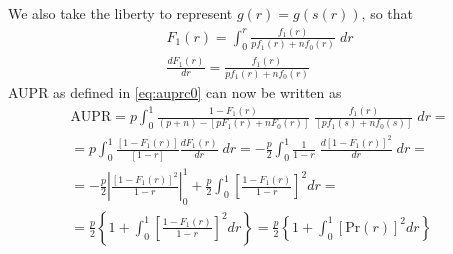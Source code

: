 We also take the liberty to represent $g(r) = g(s(r))$, so that
\begin{gather}
    F_1(r) = \int_0^r \frac{f_1(r)}{pf_1(r) + nf_0(r)} \; dr\\
    \frac{d F_1(r)}{dr} = \frac{f_1(r)}{pf_1(r) + nf_0(r)}
\end{gather}
%
AUPR as defined in \autoref{eq:auprc0} can now be written as
%
\begin{multline}
    \text{AUPR}
    = p \int_{0}^{1}
        \frac{1 - F_1(r)}{(p+n) - [pF_1(r) + nF_0(r)]}
        \; \frac{f_1(r)}{[pf_1(s) + nf_0(s)]}
    \;dr
    =\\
    = p \int_{0}^{1}
        \frac{[1 - F_1(r)]}{[1 - r]}\frac{d F_1(r)}{dr}
    \;dr
    = -\frac{p}{2} \int_{0}^{1}
        \frac{1}{1 - r}
        \; \frac{d [1 - F_1(r)]^2}{dr}
    \;dr
    =\\
    =
    - \frac{p}{2}
    \left|
        \frac{[1 - F_1(r)]^2}{1 - r}
    \right|_0^1
    + \frac{p}{2}
    \int_{0}^{1}
        \left[\frac{1 - F_1(r)}{1 - r}\right]^2
    dr
    =\\
    =
    \frac{p}{2}
    \left\{
        1 + \int_0^1 \left[\frac{1 - F_1(r)}{1 - r}\right]^2 dr
    \right\}
    =
    \frac{p}{2}
    \left\{
        1 + \int_0^1 [\text{Pr}(r)]^2 dr
    \right\}
    \label{eq:aupr ranks}
\end{multline}
%
%
